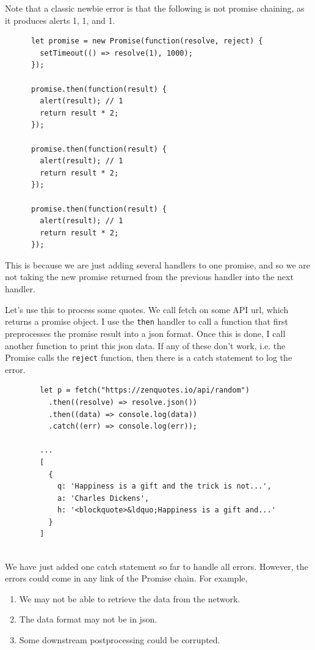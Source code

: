 \documentclass{article}
\begin{document}
    Note that a classic newbie error is that the following is not promise chaining, as it produces alerts 1, 1, and 1. 

    \begin{lstlisting}
      let promise = new Promise(function(resolve, reject) {
        setTimeout(() => resolve(1), 1000);
      });

      promise.then(function(result) {
        alert(result); // 1
        return result * 2;
      });

      promise.then(function(result) {
        alert(result); // 1
        return result * 2;
      });

      promise.then(function(result) {
        alert(result); // 1
        return result * 2;
      });
    \end{lstlisting}

    This is because we are just adding several handlers to one promise, and so we are not taking the new promise returned from the previous handler into the next handler. 

    \begin{example}
      Let's use this to process some quotes. We call fetch on some API url, which returns a promise object. I use the \texttt{then} handler to call a function that first preprocesses the promise result into a json format. Once this is done, I call another function to print this json data. If any of these don't work, i.e. the Promise calls the \texttt{reject} function, then there is a catch statement to log the error. 
      \begin{lstlisting}
        let p = fetch("https://zenquotes.io/api/random")
          .then((resolve) => resolve.json())
          .then((data) => console.log(data))
          .catch((err) => console.log(err)); 

        ... 
        [
          {
            q: 'Happiness is a gift and the trick is not...', 
            a: 'Charles Dickens',
            h: '<blockquote>&ldquo;Happiness is a gift and...'
          }
        ]
        
      \end{lstlisting}
    \end{example}

    We have just added one catch statement so far to handle all errors. However, the errors could come in any link of the Promise chain. For example, 
    \begin{enumerate}
      \item We may not be able to retrieve the data from the network. 
      \item The data format may not be in json. 
      \item Some downstream postprocessing could be corrupted. 
    \end{enumerate}
\end{document}
